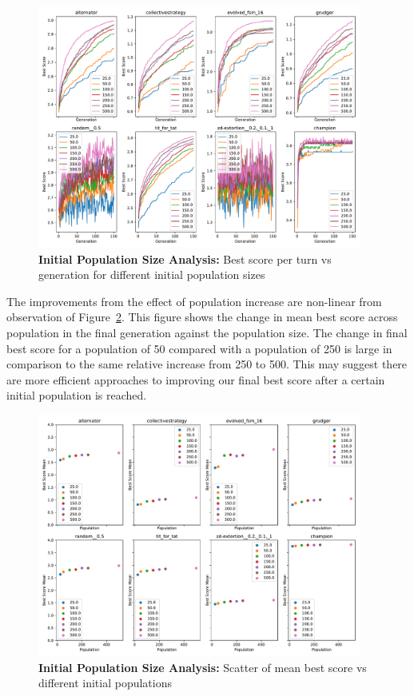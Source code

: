 \begin{figure}[ht]
    \includegraphics[width=0.95\textwidth, keepaspectratio, center]{./img/plots/INIT_POP_bs_v_gens_all.pdf}
    \caption{\textbf{Initial Population Size Analysis:} Best score per turn vs generation for different initial population sizes}\label{fig:INIT-POP-bs-v-gens-all}
\end{figure}

The improvements from the effect of population increase are non-linear from observation of Figure~\ref{fig:INIT-POP-mean-bs-v-init-pop-all}.
This figure shows the change in mean best score across population in the final generation against the population size.
The change in final best score for a population of 50 compared with a population of 250 is large in comparison to the same relative increase from 250 to 500.
This may suggest there are more efficient approaches to improving our final best score after a certain initial population is reached.

\begin{figure}[ht]
    \includegraphics[width=0.95\textwidth, keepaspectratio, center]{./img/plots/INIT_POP_mean_bs_diff_v_init_pop_all.pdf}
    \caption{\textbf{Initial Population Size Analysis:} Scatter of mean best score vs different initial populations}\label{fig:INIT-POP-mean-bs-v-init-pop-all}
\end{figure}

